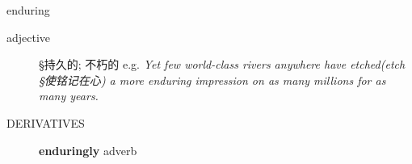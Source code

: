 \documentclass[avery5372, grid]{flashcards}
\begin{document}
\begin{flashcard}[{\B  7 Habits} {\S 词汇}]{\Huge enduring}
\begin{description}
		\item[adjective] %
			{\S 持久的; 不朽的} e.g. \textit{Yet few world-class rivers anywhere have etched\textnormal{(etch  {\S 使铭记在心})} a more enduring impression on as many millions for as many years.}
			
			
			
			
			
			
			
			
			
		\item[\textsc{DERIVATIVES}] \textbf{en\textbullet dur\textbullet ing\textbullet ly} adverb
	\end{description}
\end{flashcard}
\end{document}
